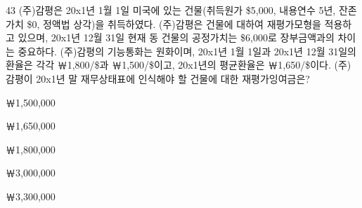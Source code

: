 \begin{question}{43}
(주)감평은 20x1년 1월 1일 미국에 있는 건물(취득원가 \$5,000, 내용연수 5년, 잔존가치 \$0, 정액법 상각)을 취득하였다. (주)감평은 건물에 대하여 재평가모형을 적용하고 있으며, 20x1년 12월 31일 현재 동 건물의 공정가치는 \$6,000로 장부금액과의 차이는 중요하다. (주)감평의 기능통화는 원화이며, 20x1년 1월 1일과 20x1년 12월 31일의 환율은 각각 ￦1,800/\$과 ￦1,500/\$이고, 20x1년의 평균환율은 ￦1,650/\$이다. (주)감평이 20x1년 말 재무상태표에 인식해야 할 건물에 대한 재평가잉여금은?
\begin{choices}
  \item ￦1,500,000
  \item ￦1,650,000
  \item ￦1,800,000
  \item ￦3,000,000
  \item ￦3,300,000
\end{choices}
\end{question}
